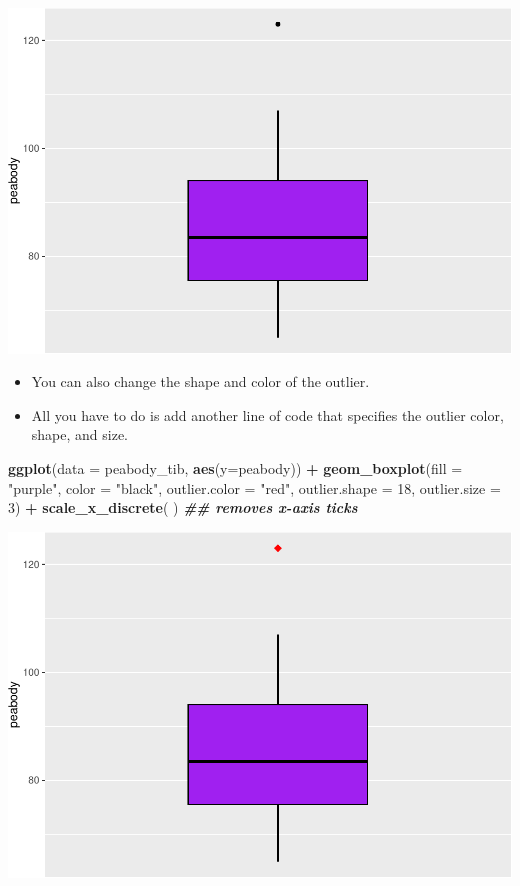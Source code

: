 \documentclass[
]{book}
\newenvironment{Shaded}{\begin{snugshade}}{\end{snugshade}}
\newcommand{\AttributeTok}[1]{\textcolor[rgb]{0.13,0.29,0.53}{#1}}
\newcommand{\DecValTok}[1]{\textcolor[rgb]{0.00,0.00,0.81}{#1}}
\newcommand{\DocumentationTok}[1]{\textcolor[rgb]{0.56,0.35,0.01}{\textbf{\textit{#1}}}}
\newcommand{\FunctionTok}[1]{\textcolor[rgb]{0.13,0.29,0.53}{\textbf{#1}}}
\newcommand{\NormalTok}[1]{#1}
\newcommand{\SpecialCharTok}[1]{\textcolor[rgb]{0.81,0.36,0.00}{\textbf{#1}}}
\newcommand{\StringTok}[1]{\textcolor[rgb]{0.31,0.60,0.02}{#1}}
\begin{document}
\includegraphics{PSY202A-Modeling-I.Heo_files/figure-latex/unnamed-chunk-73-1.pdf}

\begin{itemize}
\item
  You can also change the shape and color of the outlier.
\item
  All you have to do is add another line of code that specifies the outlier color, shape, and size.
\end{itemize}

\begin{Shaded}
\begin{Highlighting}[]
\FunctionTok{ggplot}\NormalTok{(}\AttributeTok{data =}\NormalTok{ peabody\_tib, }\FunctionTok{aes}\NormalTok{(}\AttributeTok{y=}\NormalTok{peabody)) }\SpecialCharTok{+}
  \FunctionTok{geom\_boxplot}\NormalTok{(}\AttributeTok{fill =} \StringTok{"purple"}\NormalTok{, }\AttributeTok{color =} \StringTok{"black"}\NormalTok{,}
               \AttributeTok{outlier.color =} \StringTok{"red"}\NormalTok{, }\AttributeTok{outlier.shape =} \DecValTok{18}\NormalTok{, }\AttributeTok{outlier.size =} \DecValTok{3}\NormalTok{) }\SpecialCharTok{+}
  \FunctionTok{scale\_x\_discrete}\NormalTok{( ) }\DocumentationTok{\#\# removes x{-}axis ticks}
\end{Highlighting}
\end{Shaded}

\includegraphics{PSY202A-Modeling-I.Heo_files/figure-latex/unnamed-chunk-74-1.pdf}
\end{document}
